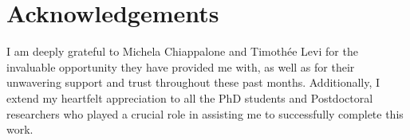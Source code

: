 \chapter*{Acknowledgements}

I am deeply grateful to Michela Chiappalone and Timothée Levi for the invaluable opportunity they have provided me with, as well as for their unwavering support and trust throughout these past months. Additionally, I extend my heartfelt appreciation to all the PhD students and Postdoctoral researchers who played a crucial role in assisting me to successfully complete this work.


